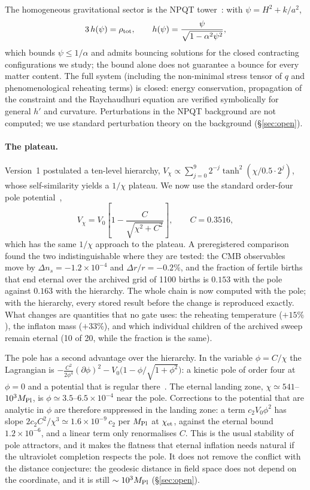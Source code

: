 \documentclass[11pt,a4paper]{article}
\newcommand{\Mpl}{M_{\rm Pl}}
\begin{document}
The homogeneous gravitational sector is the NPQT tower~\cite{Bueno2025formation}: with $\psi = H^2 + k/a^2$,
\begin{equation}
3\,h(\psi) = \rho_{\rm tot},\qquad h(\psi) = \frac{\psi}{\sqrt{1-\alpha^2\psi^2}},
\label{eq:friedmann}
\end{equation}
which bounds $\psi \le 1/\alpha$ and admits bouncing solutions for the closed contracting configurations we study; the bound alone does not guarantee a bounce for every matter content.
The full system (including the non-minimal stress tensor of $q$ and phenomenological reheating terms) is closed: energy conservation, propagation of the constraint and the Raychaudhuri equation are verified symbolically for general $h'$ and curvature.
Perturbations in the NPQT background are not computed; we use standard perturbation theory on the background (\S\ref{sec:open}).

\paragraph{The plateau.}
Version~1 postulated a ten-level hierarchy, $V_\chi\propto\sum_{j=0}^{9}2^{-j}\tanh^2(\chi/0.5\cdot2^j)$, whose self-similarity yields a $1/\chi$ plateau.
We now use the standard order-four pole potential~\cite{GKLR2015},
\begin{equation}
V_\chi = V_0\left[1-\frac{C}{\sqrt{\chi^2+C^2}}\right],\qquad C = 0.3516,
\end{equation}
which has the same $1/\chi$ approach to the plateau.
A preregistered comparison found the two indistinguishable where they are tested: the CMB observables move by $\Delta n_s=-1.2\times10^{-4}$ and $\Delta r/r=-0.2\%$, and the fraction of fertile births that end eternal over the archived grid of 1100 births is $0.153$ with the pole against $0.163$ with the hierarchy.
The whole chain is now computed with the pole; with the hierarchy, every stored result before the change is reproduced exactly.
What changes are quantities that no gate uses: the reheating temperature ($+15\%$), the inflaton mass ($+33\%$), and which individual children of the archived sweep remain eternal (10 of 20, while the fraction is the same).

The pole has a second advantage over the hierarchy.
In the variable $\phi=C/\chi$ the Lagrangian is $-\tfrac{C^2}{2\phi^4}(\partial\phi)^2-V_0\big(1-\phi/\sqrt{1+\phi^2}\big)$: a kinetic pole of order four at $\phi=0$ and a potential that is regular there~\cite{GKLR2015}.
The eternal landing zone, $\chi\simeq541$--$10^3\Mpl$, is $\phi\simeq3.5$--$6.5\times10^{-4}$ near the pole.
Corrections to the potential that are analytic in $\phi$ are therefore suppressed in the landing zone: a term $c_2V_0\phi^2$ has slope $2c_2C^2/\chi^3\simeq1.6\times10^{-9}\,c_2$ per $\Mpl$ at $\chi_{\rm et}$, against the eternal bound $1.2\times10^{-6}$, and a linear term only renormalises $C$.
This is the usual stability of pole attractors, and it makes the flatness that eternal inflation needs natural if the ultraviolet completion respects the pole.
It does not remove the conflict with the distance conjecture: the geodesic distance in field space does not depend on the coordinate, and it is still $\sim10^3\Mpl$ (\S\ref{sec:open}).
\end{document}
